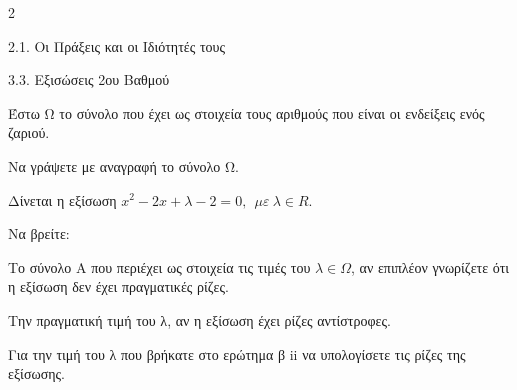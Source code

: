 \begin{ylh}{2}
    \item 2.1. Οι Πράξεις και οι Ιδιότητές τους
    \item 3.3. Εξισώσεις 2ου Βαθμού
\end{ylh}
Έστω Ω το σύνολο που έχει ως στοιχεία τους αριθμούς που είναι οι ενδείξεις ενός ζαριού.

\begin{alist}
\item Να γράψετε με αναγραφή το σύνολο Ω.
\item Δίνεται η εξίσωση $x^{2} - 2x + \lambda - 2 = 0,\ \ \mu\varepsilon\ \lambda \in R.\ $

Να βρείτε:
\begin{rlist}
\item
  Το σύνολο Α που περιέχει ως στοιχεία τις τιμές του $\lambda \in \Omega$, αν επιπλέον γνωρίζετε ότι η εξίσωση δεν έχει πραγματικές ρίζες.
\item
  Την πραγματική τιμή του λ, αν η εξίσωση έχει ρίζες αντίστροφες.
\end{rlist}
\item Για την τιμή του λ που βρήκατε στο ερώτημα β ii να υπολογίσετε τις ρίζες της εξίσωσης.
\end{alist}

